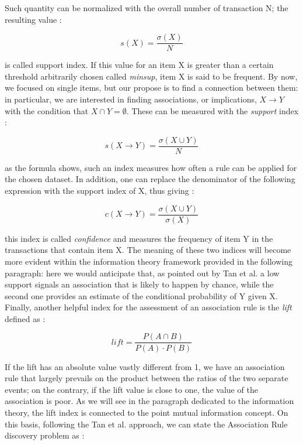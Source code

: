 \documentclass[12pt,%
               a4paper,%
               oneside,openany,%
               titlepage,%
               headinclude,footinclude,%
               BCOR5mm,%
               cleardoublepage=empty,%
               tablecaptionabove,%
               floatperchapter,
               ]{scrreprt}                 %
\begin{document}
Such quantity can be normalized with the overall number of transaction N; the resulting value \cite{tan2019introduction}:

\begin{equation}
s(X)= \frac{\sigma(X)}{N}
\end{equation}

is called support index. If this value for an item X is greater than a certain threshold arbitrarily chosen called \textit{minsup}, item X is said to be frequent. By now, we focused on single items, but our propose is to find a connection between them: in particular, we are interested in finding associations, or implications, $X \rightarrow Y $ with the condition that $X \cap Y = \emptyset $. These can be measured with the \textit{support} index  \cite{tan2019introduction}:

\begin{equation}
s(X \rightarrow Y) = \dfrac{\sigma(X \cup Y)}{N}
\end{equation}

as the formula shows, such an index measures how often a rule can be applied for the chosen dataset. In addition, one can replace the denominator of the following expression with the support index of X, thus giving \cite{tan2019introduction}:

\begin{equation}
c(X \rightarrow Y) = \dfrac{\sigma(X \cup Y)}{\sigma(X)}
\end{equation}

this index is called \textit{confidence} and measures the frequency of item Y in the transactions that contain item X. The meaning of these two indices will become more evident within the information theory framework provided in the following paragraph: here we would anticipate that, as pointed out by Tan et al.\cite{tan2019introduction} a low support signals an association that is likely to happen by chance, while the second one provides an estimate of the conditional probability of Y given X. Finally, another helpful index for the assessment of an association rule is the \textit{lift} defined as \cite{tuffery2011data}:

\begin{equation}
lift = \frac{P\left( A \cap B \right)}{P(A) \cdot P(B)}
\end{equation}

If the lift has an absolute value vastly different from 1, we have an association rule that largely prevails on the product between the ratios of the two separate events; on the contrary, if the lift value is close to one, the value of the association is poor. As we will see in the paragraph dedicated to the information theory, the lift index is connected to the point mutual information concept. On this basis, following the Tan et al. approach, we can state the Association Rule discovery problem as \cite{tan2019introduction}:
\end{document}
